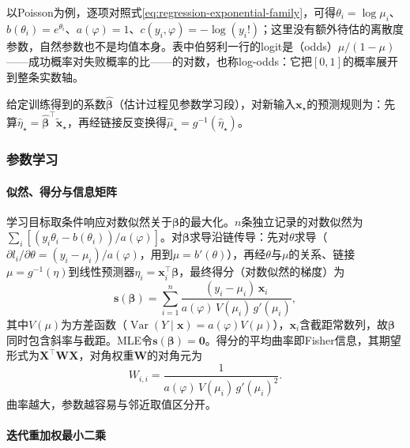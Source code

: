 以Poisson为例，逐项对照式\eqref{eq:regression-exponential-family}，可得$\theta_i=\log\mu_i$、$b(\theta_i)=e^{\theta_i}$、$a(\varphi)=1$、$c(y_i,\varphi)=-\log(y_i!)$；这里没有额外待估的离散度参数，自然参数也不是均值本身。表中伯努利一行的logit是（odds）$\mu/(1-\mu)$——成功概率对失败概率的比——的对数，也称log-odds：它把$[0,1]$的概率展开到整条实数轴。

给定训练得到的系数$\widehat{\bm{\beta}}$（估计过程见参数学习段），对新输入$\bm{x}_\star$的预测规则为：先算$\widehat\eta_\star=\widehat{\bm{\beta}}^{\top}\widetilde{\bm{x}}_\star$，再经链接反变换得$\widehat\mu_\star=g^{-1}(\widehat\eta_\star)$。

\subsubsection{参数学习}
\label{sec:regression-glm-learning}

\paragraph{似然、得分与信息矩阵}

学习目标取条件响应对数似然关于$\bm{\beta}$的最大化。$n$条独立记录的对数似然为$\sum_i[(y_i\theta_i-b(\theta_i))/a(\varphi)]$。对$\bm{\beta}$求导沿链传导：先对$\theta$求导（$\partial l_i/\partial\theta=(y_i-\mu_i)/a(\varphi)$，用到$\mu=b'(\theta)$），再经$\theta$与$\mu$的关系、链接$\mu=g^{-1}(\eta)$到线性预测器$\eta_i=\bm{x}_i^{\top}\bm{\beta}$，最终得分（对数似然的梯度）为
\begin{equation}
  \bm{s}(\bm{\beta})
  =\sum_{i=1}^n
    \frac{(y_i-\mu_i)\,\bm{x}_i}
         {a(\varphi)\,V(\mu_i)\,g'(\mu_i)},
  \label{eq:regression-glm-score}
\end{equation}
其中$V(\mu)$为方差函数（$\operatorname{Var}(Y\mid\bm x)=a(\varphi)V(\mu)$），$\bm{x}_i$含截距常数列，故$\bm{\beta}$同时包含斜率与截距。MLE令$\bm{s}(\bm{\beta})=\bm{0}$。得分的平均曲率即Fisher信息，其期望形式为$\bm{X}^{\top}\bm{W}\bm{X}$，对角权重$\bm{W}$的对角元为
\begin{equation}
  W_{i,i}=\frac{1}{a(\varphi)\,V(\mu_i)\,g'(\mu_i)^2}.
  \label{eq:regression-glm-fisher-weight}
\end{equation}
曲率越大，参数越容易与邻近取值区分开。

\paragraph{迭代重加权最小二乘}

